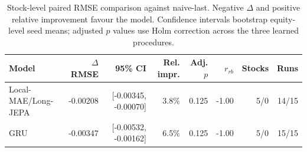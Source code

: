 \begin{table}[t]
\centering
\small
\caption{Stock-level paired RMSE comparison against naive-last. Negative $\Delta$ and positive relative improvement favour the model. Confidence intervals bootstrap equity-level seed means; adjusted $p$ values use Holm correction across the three learned procedures.}
\label{tab:paired_rmse_naive}
\begin{tabular}{lrrrrrrr}
\toprule
Model & $\Delta$RMSE & 95\% CI & Rel. impr. & Adj. $p$ & $r_{rb}$ & Stocks & Runs \\
\midrule
Local-MAE/Long-JEPA & -0.00208 & [-0.00345, -0.00070] & 3.8\% & 0.125 & -1.00 & 5/0 & 14/15 \\
GRU & -0.00347 & [-0.00532, -0.00162] & 6.5\% & 0.125 & -1.00 & 5/0 & 15/15 \\
\bottomrule
\end{tabular}
\end{table}
